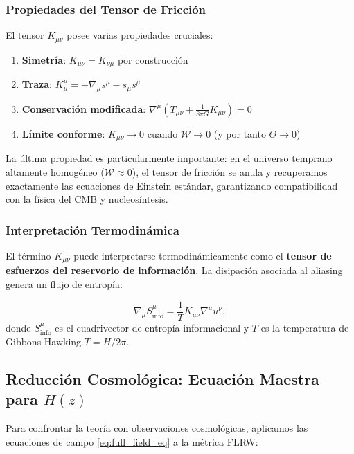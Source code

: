 \documentclass[12pt, a4paper]{article}
\theoremstyle{plain}
\theoremstyle{definition}
\begin{document}
\subsubsection{Propiedades del Tensor de Fricción}

El tensor $K_{\mu\nu}$ posee varias propiedades cruciales:

\begin{enumerate}
    \item \textbf{Simetría}: $K_{\mu\nu} = K_{\nu\mu}$ por construcción
    \item \textbf{Traza}: $K^\mu_\mu = -\nabla_\mu s^\mu - s_\mu s^\mu$
    \item \textbf{Conservación modificada}: $\nabla^\mu (T_{\mu\nu} + \frac{1}{8\pi G} K_{\mu\nu}) = 0$
    \item \textbf{Límite conforme}: $K_{\mu\nu} \to 0$ cuando $\mathcal{W} \to 0$ (y por tanto $\Theta \to 0$)
\end{enumerate}

La última propiedad es particularmente importante: en el universo temprano altamente homogéneo ($\mathcal{W} \approx 0$), el tensor de fricción se anula y recuperamos exactamente las ecuaciones de Einstein estándar, garantizando compatibilidad con la física del CMB y nucleosíntesis.

\subsubsection{Interpretación Termodinámica}

El término $K_{\mu\nu}$ puede interpretarse termodinámicamente como el \textbf{tensor de esfuerzos del reservorio de información}. La disipación asociada al aliasing genera un flujo de entropía:

\begin{equation}
\nabla_\mu S^\mu_{\text{info}} = \frac{1}{T} K_{\mu\nu} \nabla^\mu u^\nu,
\end{equation}
donde $S^\mu_{\text{info}}$ es el cuadrivector de entropía informacional y $T$ es la temperatura de Gibbons-Hawking $T = H/2\pi$.

\subsection{Reducción Cosmológica: Ecuación Maestra para $H(z)$}

Para confrontar la teoría con observaciones cosmológicas, aplicamos las ecuaciones de campo \eqref{eq:full_field_eq} a la métrica FLRW:
\end{document}
